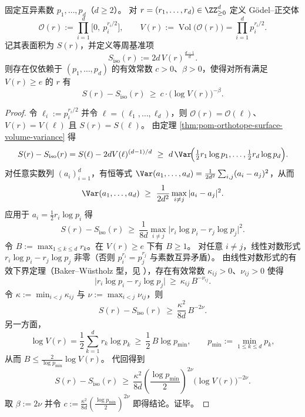 \begin{theorem}\label{thm:pom-godel-orthotope-arithmetic-isoperimetric-gap}
固定互异素数 \(p_1,\dots,p_d\)（\(d\ge 2\)）。
对 \(r=(r_1,\dots,r_d)\in\ZZ_{\ge 0}^d\) 定义 Gödel--正交体
\[
\mathcal O(r):=\prod_{i=1}^d\bigl[0,\ p_i^{r_i/2}\bigr],
\qquad
V(r):=\operatorname{Vol}\bigl(\mathcal O(r)\bigr)=\prod_{i=1}^d p_i^{r_i/2}.
\]
记其表面积为 \(S(r)\)，并定义等周基准项
\[
S_{\mathrm{iso}}(r):=2d\,V(r)^{\frac{d-1}{d}}.
\]
则存在仅依赖于 \((p_1,\dots,p_d)\) 的有效常数 \(c>0\)、\(\beta>0\)，使得对所有满足 \(V(r)\ge e\) 的 \(r\) 有
\[
S(r)-S_{\mathrm{iso}}(r)\ \ge\ c\cdot\bigl(\log V(r)\bigr)^{-\beta}.
\]
\end{theorem}
\begin{proof}
令 \(\ell_i:=p_i^{r_i/2}\) 并令 \(\ell=(\ell_1,\dots,\ell_d)\)，则 \(\mathcal O(r)=\mathcal O(\ell)\)、\(V(r)=V(\ell)\) 且 \(S(r)=S(\ell)\)。
由定理 \ref{thm:pom-orthotope-surface-volume-variance} 得
\[
S(r)-S_{\mathrm{iso}}(r)=S(\ell)-2dV(\ell)^{(d-1)/d}
\ \ge\ d\,\Var\!\Bigl(\tfrac12 r_1\log p_1,\dots,\tfrac12 r_d\log p_d\Bigr).
\]
对任意实数列 \((a_i)_{i=1}^d\)，有恒等式
\(
\Var(a_1,\dots,a_d)=\frac{1}{2d^2}\sum_{i,j}(a_i-a_j)^2
\)，从而
\[
\Var(a_1,\dots,a_d)\ \ge\ \frac{1}{2d^2}\max_{i\ne j}|a_i-a_j|^2.
\]
应用于 \(a_i=\tfrac12 r_i\log p_i\) 得
\[
S(r)-S_{\mathrm{iso}}(r)\ \ge\ \frac{1}{8d}\max_{i\ne j}\bigl|r_i\log p_i-r_j\log p_j\bigr|^2.
\]
令 \(B:=\max_{1\le k\le d}r_k\)。在 \(V(r)\ge e\) 下有 \(B\ge 1\)。
对任意 \(i\ne j\)，线性对数形式 \(r_i\log p_i-r_j\log p_j\) 非零（否则 \(p_i^{r_i}=p_j^{r_j}\) 与素数互异矛盾）。
由线性对数形式的有效下界定理（Baker--W{\"u}stholz 型，见 \cite{BakerWustholz2007LogarithmicForms}），存在有效常数 \(\kappa_{ij}>0\)、\(\nu_{ij}>0\) 使得
\[
\bigl|r_i\log p_i-r_j\log p_j\bigr|\ \ge\ \kappa_{ij}\,B^{-\nu_{ij}}.
\]
令 \(\kappa:=\min_{i<j}\kappa_{ij}\) 与 \(\nu:=\max_{i<j}\nu_{ij}\)，则
\[
S(r)-S_{\mathrm{iso}}(r)\ \ge\ \frac{\kappa^2}{8d}\,B^{-2\nu}.
\]
另一方面，
\[
\log V(r)=\frac12\sum_{k=1}^d r_k\log p_k\ \ge\ \frac12\,B\log p_{\min},
\qquad
p_{\min}:=\min_{1\le k\le d}p_k,
\]
从而 \(B\le \frac{2}{\log p_{\min}}\log V(r)\)。
代回得到
\[
S(r)-S_{\mathrm{iso}}(r)\ \ge\
\frac{\kappa^2}{8d}\left(\frac{\log p_{\min}}{2}\right)^{2\nu}\bigl(\log V(r)\bigr)^{-2\nu}.
\]
取 \(\beta:=2\nu\) 并令 \(c:=\frac{\kappa^2}{8d}(\frac{\log p_{\min}}{2})^{2\nu}\) 即得结论。证毕。
\end{proof}

\endinput
